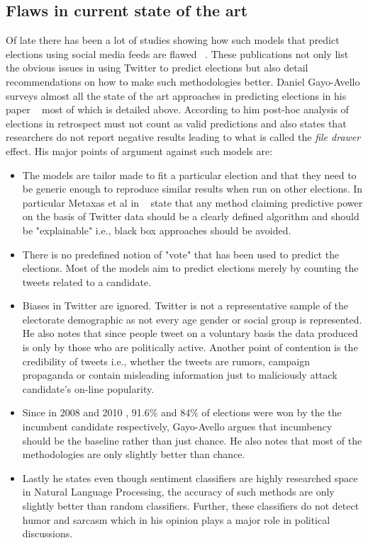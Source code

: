 \subsection{Flaws in current state of the art}
Of late there has been a lot of studies showing how such models that predict elections using social media feeds are flawed ~\cite{metaxas2011not,gayo2012wanted,gayo2011don,gayo2011limits}.
These publications not only list the obvious issues in using Twitter to predict elections but also detail recommendations on how to make such methodologies better.
Daniel Gayo-Avello surveys almost all the state of the art approaches in predicting elections in his paper ~\cite{gayo2012wanted} most of which is detailed above.
According to him post-hoc analysis of elections in retrospect must not count as valid predictions and also states that researchers do not report negative results leading to what is called the \emph{file drawer} effect. 
His major points of argument against such models are:
\begin{itemize}
\item
The models are tailor made to fit a particular election and that they need to be generic enough to reproduce similar results when run on other elections.
In particular Metaxas et al in ~\cite{metaxas2011not} state that any method claiming predictive power on the basis of Twitter data should be a clearly defined algorithm and should be "explainable" i.e., black box approaches should be avoided.
\item
There is no predefined notion of "vote" that has been used to predict the elections.
Most of the models aim to predict elections merely by counting the tweets related to a candidate.
\item
Biases in Twitter are ignored. Twitter is not a representative sample of the electorate demographic as not every age gender or social group is represented.
He also notes that since people tweet on a voluntary basis the data produced is only by those who are politically active. 
Another point of contention is the credibility of tweets i.e., whether the tweets are rumors, campaign propaganda or contain misleading information just to maliciously attack candidate's on-line popularity.
\item
Since in 2008 and 2010 , 91.6\% and 84\% of elections were won by the the incumbent candidate respectively, Gayo-Avello argues that incumbency should be the baseline rather than just chance.
He also notes that most of the methodologies are only slightly better than chance.
\item
Lastly he states even though sentiment classifiers are highly researched space in Natural Language Processing, the accuracy of such methods are only slightly better than random classifiers. 
Further, these classifiers do not detect humor and sarcasm which in his opinion plays a major role in political discussions.
\end{itemize}
